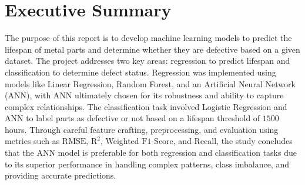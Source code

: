 \documentclass{article}
\begin{document}


\begin{cwauthorlist}

\end{cwauthorlist}




\section{Executive Summary}

The purpose of this report is to develop machine learning models to predict the lifespan of metal parts and determine whether they are defective based on a given dataset. The project addresses two key areas: regression to predict lifespan and classification to determine defect status. Regression was implemented using models like Linear Regression, Random Forest, and an Artificial Neural Network (ANN), with ANN ultimately chosen for its robustness and ability to capture complex relationships. The classification task involved Logistic Regression and ANN to label parts as defective or not based on a lifespan threshold of $1500$ hours. Through careful feature crafting, preprocessing, and evaluation using metrics such as $\text{RMSE}$, $\text{R}^2$, Weighted $\text{F1}$-Score, and Recall, the study concludes that the ANN model is preferable for both regression and classification tasks due to its superior performance in handling complex patterns, class imbalance, and providing accurate predictions.
\end{document}
